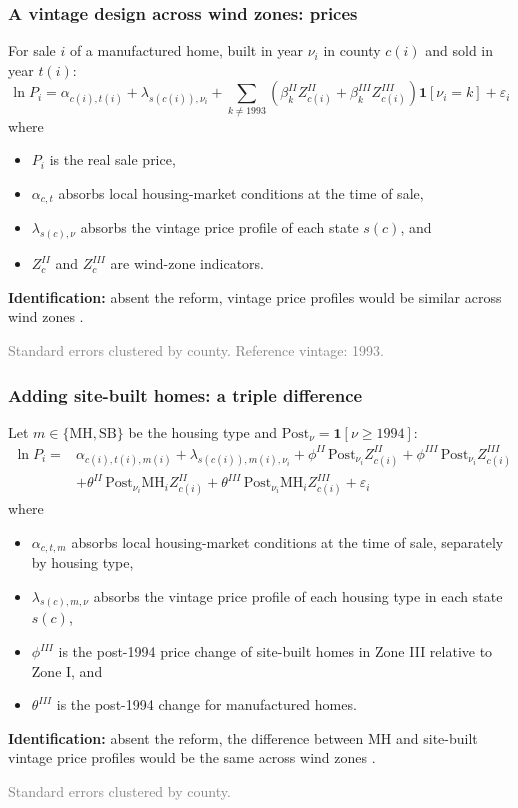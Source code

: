 \documentclass[11pt,xcolor={dvipsnames},hyperref={pdftex,pdfpagemode=UseNone,hidelinks,pdfdisplaydoctitle=true},usepdftitle=false,aspectratio=169]{beamer}
\newcommand{\gc}[1]{{\footnotesize\textcolor{gray}{#1}}}
\begin{document}
\begin{frame}
    \frametitle{A vintage design across wind zones: prices}
    For sale $i$ of a manufactured home, built in year $\nu_i$ in county $c(i)$ and sold in year $t(i)$:
    \[
    \ln P_i = \alpha_{c(i),t(i)} + \lambda_{s(c(i)),\nu_i}
      + \sum_{k\neq 1993}\left(\beta^{II}_k Z^{II}_{c(i)} + \beta^{III}_k Z^{III}_{c(i)}\right)
      \mathbf{1}[\nu_i=k] + \varepsilon_i
    \]
    where
    \begin{itemize}
        \item $P_i$ is the real sale price,
        \item $\alpha_{c,t}$ absorbs local housing-market conditions at the time of sale,
        \item $\lambda_{s(c),\nu}$ absorbs the vintage price profile of each state $s(c)$, and
        \item $Z_c^{II}$ and $Z_c^{III}$ are wind-zone indicators.
    \end{itemize}
    \vspace{0.5em}
    \textbf{Identification:} absent the reform, vintage price profiles would be similar across wind zones .

    \vfill
    \gc{Standard errors clustered by county. Reference vintage: 1993.}
\end{frame}

\begin{frame}
    \frametitle{Adding site-built homes: a triple difference}
    Let $m\in\{\text{MH},\text{SB}\}$ be the housing type and $\mathrm{Post}_\nu=\mathbf{1}[\nu\geq 1994]$:
    \[
    \begin{split}
    \ln P_i = {} & \alpha_{c(i),t(i),m(i)} + \lambda_{s(c(i)),m(i),\nu_i}
      + \phi^{II}\,\mathrm{Post}_{\nu_i} Z^{II}_{c(i)} + \phi^{III}\,\mathrm{Post}_{\nu_i} Z^{III}_{c(i)} \\
    & + \theta^{II}\,\mathrm{Post}_{\nu_i}\text{MH}_i Z^{II}_{c(i)}
      + \theta^{III}\,\mathrm{Post}_{\nu_i}\text{MH}_i Z^{III}_{c(i)} + \varepsilon_i
    \end{split}
    \]
    where
    \begin{itemize}
        \item $\alpha_{c,t,m}$ absorbs local housing-market conditions at the time of sale, separately by housing type,
        \item $\lambda_{s(c),m,\nu}$ absorbs the vintage price profile of each housing type in each state $s(c)$,
        \item $\phi^{III}$ is the post-1994 price change of site-built homes in Zone III relative to Zone I, and
        \item $\theta^{III}$ is the  post-1994 change for manufactured homes.
    \end{itemize}
    \vspace{0.5em}
    \textbf{Identification:} absent the reform, the difference between MH and site-built vintage price profiles would be the same across wind zones .

    \vfill
    \gc{Standard errors clustered by county.}
\end{frame}
\end{document}
